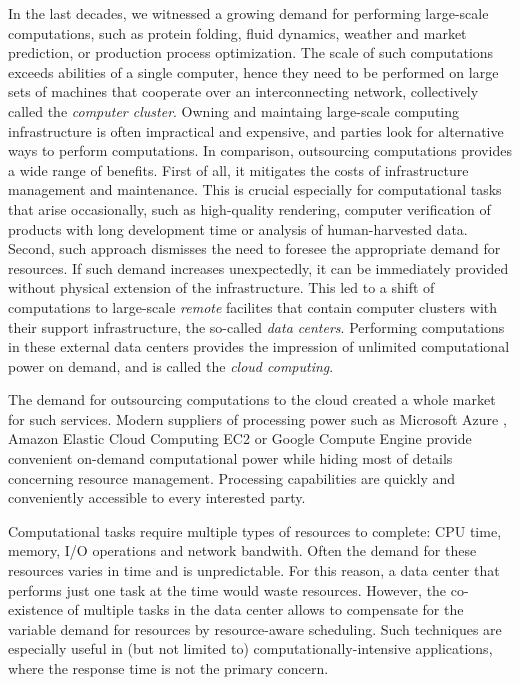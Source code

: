 \indent
In the last decades, we witnessed a growing demand for performing large-scale
computations, such as protein folding, fluid dynamics, weather and market prediction, or production process optimization.
The scale of such computations exceeds abilities of a single computer, hence they need to be performed on large sets of machines that cooperate over an interconnecting network, collectively called the \emph{computer cluster}.
Owning and maintaing large-scale computing infrastructure is often impractical and expensive, and parties look for alternative ways to perform computations.
In comparison, outsourcing computations provides a wide range of benefits.
First of all, it mitigates the costs of infrastructure management and maintenance.
This is crucial especially for computational tasks that arise occasionally, such as high-quality rendering, computer verification of products with long development time or analysis of human-harvested data.
Second, such approach dismisses the need to foresee the appropriate demand for resources.
If such demand increases unexpectedly, it can be immediately provided without physical extension of the infrastructure.
This led to a shift of computations to large-scale \emph{remote} facilites that contain computer clusters with their support infrastructure, the so-called \emph{data centers}.
Performing computations in these external data centers provides the impression of unlimited computational power on demand, and is called the \emph{cloud computing}.

The demand for outsourcing computations to the cloud created a whole market for such services.
Modern suppliers of processing power such as Microsoft Azure \cite{url-azure}, Amazon Elastic Cloud Computing EC2 \cite{url-amazon-ec2} or Google Compute Engine \cite{url-gce} provide convenient on-demand computational power while hiding most of details concerning resource management.
Processing capabilities are quickly and conveniently accessible to every interested party.

Computational tasks require multiple types of resources to complete: CPU time, memory, I/O operations and network bandwith.
Often the demand for these resources varies in time and is unpredictable.
For this reason, a data center that performs just one task at the time would waste resources.
However, the co-existence of multiple tasks in the data center allows to compensate for the variable demand for resources by resource-aware scheduling.
Such techniques are especially useful in (but not limited to) computationally-intensive applications, where the response time is not the primary concern.

